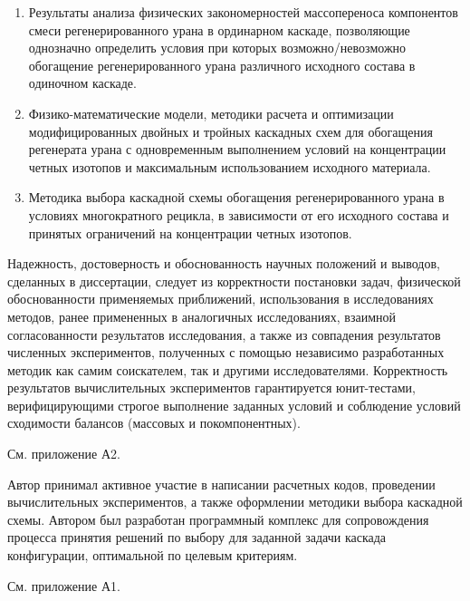 {}
\begin{enumerate}
  \item Результаты анализа физических закономерностей массопереноса компонентов смеси регенерированного урана в ординарном каскаде, позволяющие однозначно определить условия при которых возможно/невозможно обогащение регенерированного урана различного исходного состава в одиночном каскаде.
  \item Физико-математические модели, методики расчета и оптимизации модифицированных двойных и тройных каскадных схем для обогащения
  регенерата урана с одновременным выполнением условий на концентрации четных изотопов и максимальным использованием исходного материала.
  \item Методика выбора каскадной схемы обогащения регенерированного урана в условиях многократного рецикла, в зависимости от его исходного состава и принятых ограничений на концентрации четных изотопов.
\end{enumerate}

{\reliability} Надежность, достоверность и обоснованность научных положений и выводов, сделанных в диссертации, следует из корректности постановки задач, физической обоснованности применяемых приближений, использования в исследованиях методов, ранее примененных в аналогичных исследованиях, взаимной согласованности результатов исследования, а также из совпадения результатов численных экспериментов, полученных с помощью независимо разработанных методик как самим соискателем, так и другими исследователями. Корректность результатов вычислительных экспериментов гарантируется юнит-тестами, верифицирующими строгое выполнение заданных условий и соблюдение условий сходимости балансов (массовых и покомпонентных).

{\probation}
См. приложение А2.

{\contribution} Автор принимал активное участие в написании расчетных кодов, проведении вычислительных экспериментов, а также оформлении методики выбора каскадной схемы. Автором был разработан программный комплекс для сопровождения процесса принятия решений по выбору для заданной задачи каскада конфигурации, оптимальной по целевым критериям.

{\publications} См. приложение А1.


